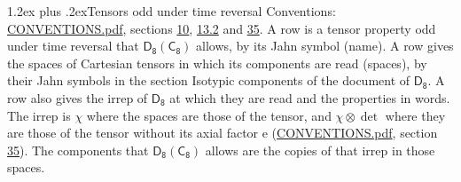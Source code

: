 \documentclass[10pt,a4paper]{article}
\makeatletter
\renewcommand\section{\@startsection{section}{1}{\z@}{-3ex plus -1ex minus -.2ex}%
  {1.2ex plus .2ex}{\normalfont\large\sffamily\bfseries\color{parttitle}}}
\numberwithin{equation}{section}
\newcommand{\grp}[1]{\mathsf{#1}}
\newcommand{\irrprod}{\otimes}
\makeatother
\begin{document}
\section{Tensors odd under time reversal}\label{s:time_odd}
Conventions: \href{../../CONVENTIONS.pdf}{CONVENTIONS.pdf}, sections \href{../../../rotation/CONVENTIONS.pdf\#conv.10}{10}, \href{../../../rotation/CONVENTIONS.pdf\#conv.13.2}{13.2} and \href{../../CONVENTIONS.pdf\#conv.35}{35}.
\leavevmode\label{n:head.name.property}A row is a tensor property odd under time reversal that $\grp{D_{8}}(\grp{C_{8}})$ allows, by its Jahn symbol (name). \label{n:head.spaces}A row gives the spaces of Cartesian tensors in which its components are read (spaces), by their Jahn symbols in the section Isotypic components of the document of \href{../../../rotation/data/pdf/D8.pdf}{$\grp{D_{8}}$}. \label{n:head.properties}A row also gives the irrep of $\grp{D_{8}}$ at which they are read and the properties in words. The irrep is $\chi$ where the spaces are those of the tensor, and $\chi \irrprod \det$ where they are those of the tensor without its axial factor e (\href{../../CONVENTIONS.pdf}{CONVENTIONS.pdf}, section \href{../../CONVENTIONS.pdf\#conv.35}{35}). The components that $\grp{D_{8}}(\grp{C_{8}})$ allows are the copies of that irrep in those spaces.
\end{document}
